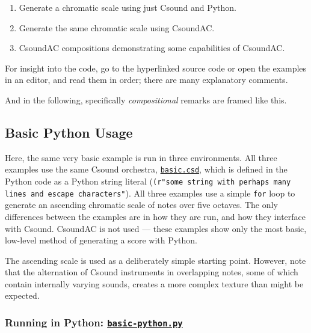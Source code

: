 \documentclass[letterpaper,10pt,DIV=12,parskip=half]{scrartcl}
\begin{document}
\begin{enumerate}
\item Generate a chromatic scale using just Csound and Python.
\item Generate the same chromatic scale using CsoundAC.
\item CsoundAC compositions demonstrating some capabilities of CsoundAC.
\end{enumerate}

For insight into the code, go to the hyperlinked source code or open the examples in an editor, and read them in order; there are many explanatory comments.

\begin{canaryframed}
And in the following, specifically \emph{compositional} remarks are framed like this.
\end{canaryframed}

\subsection{Basic Python Usage}

Here, the same very basic example is run in three environments. All three examples use the same Csound orchestra, \href{https://github.com/gogins/csound-ac/blob/master/user-guide/basic.csd}{\lstinline|basic.csd|}, which is defined in the Python code as a Python string literal (\lstinline|(r"some string with perhaps many lines and escape characters"|). All three examples use a simple \lstinline|for| loop to generate an ascending chromatic scale of notes over five octaves. The only differences between the examples are in how they are run, and how they interface with Csound. CsoundAC is not used --- these examples show only the most basic, low-level method of generating a score with Python.

\begin{canaryframed}
The ascending scale is used as a deliberately simple starting point. However, note that the alternation of Csound instruments in overlapping notes, some of which contain internally varying sounds, creates a more complex texture than might be expected.
\end{canaryframed}

\subsubsection{Running in Python: \href{https://github.com/gogins/csound-ac/blob/master/user-guide/basic-python.py}{\lstinline|basic-python.py|}}
\end{document}
